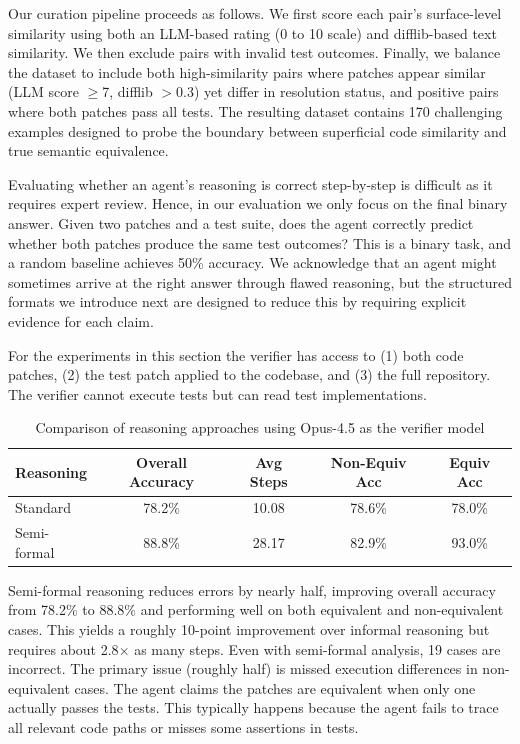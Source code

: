 \documentclass[]{meta}
\begin{document}
Our curation pipeline proceeds as follows. We first score each pair's surface-level similarity using both an LLM-based rating (0 to 10 scale) and difflib-based text similarity. We then exclude pairs with invalid test outcomes. Finally, we balance the dataset to include both high-similarity pairs where patches appear similar (LLM score $\geq$7, difflib $>$0.3) yet differ in resolution status, and positive pairs where both patches pass all tests. The resulting dataset contains 170 challenging examples designed to probe the boundary between superficial code similarity and true semantic equivalence.

Evaluating whether an agent's reasoning is correct step-by-step is difficult as it requires expert review. Hence, in our evaluation we only focus on the final binary answer. Given two patches and a test suite, does the agent correctly predict whether both patches produce the same test outcomes? This is a binary task, and a random baseline achieves 50\% accuracy. We acknowledge that an agent might sometimes arrive at the right answer through flawed reasoning, but the structured formats we introduce next are designed to reduce this by requiring explicit evidence for each claim.

For the experiments in this section the verifier has access to (1) both code patches, (2) the test patch applied to the codebase, and (3) the full repository. The verifier cannot execute tests but can read test implementations.

\begin{table}[h]
\centering
\caption{Comparison of reasoning approaches using Opus-4.5 as the verifier model}
\label{tab:reasoning}
\begin{tabular}{lcccc}
\toprule
\textbf{Reasoning} & \textbf{Overall Accuracy} & \textbf{Avg Steps} & \textbf{Non-Equiv Acc} & \textbf{Equiv Acc} \\
\midrule
Standard & 78.2\% & 10.08 & 78.6\% & 78.0\% \\
Semi-formal & 88.8\% & 28.17 & 82.9\% & 93.0\% \\

\bottomrule
\end{tabular}
\end{table}

Semi-formal reasoning reduces errors by nearly half, improving overall accuracy from 78.2\% to 88.8\% and performing well on both equivalent and non-equivalent cases. This yields a roughly 10-point improvement over informal reasoning but requires about 2.8$\times$ as many steps. Even with semi-formal analysis, 19 cases are incorrect. The primary issue (roughly half) is missed execution differences in non-equivalent cases. The agent claims the patches are equivalent when only one actually passes the tests. This typically happens because the agent fails to trace all relevant code paths or misses some assertions in tests.
\end{document}
